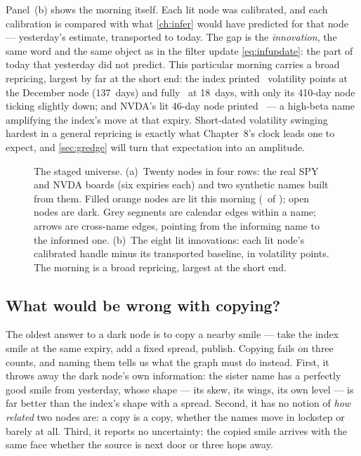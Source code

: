 Panel~(b) shows the morning itself.  Each lit node was calibrated, and
each calibration is compared with what \cref{ch:infer} would have
predicted for that node --- yesterday's estimate, transported to today.
The gap is the \emph{innovation}, the same word and the same object as
in the filter update \cref{eq:infupdate}: the part of today that
yesterday did not predict.  This particular morning carries a broad
repricing, largest by far at the short end: the index printed
\MacGrSpyDecObs\ volatility points at the December node (137~days)
and fully \MacGrSpyShortObs\ at 18~days, with only its 410-day node
ticking slightly down; and NVDA's lit 46-day node printed
\MacGrNvdaSepObs\ --- a high-beta name amplifying the index's move at
that expiry.  Short-dated volatility swinging hardest in a general
repricing is exactly what Chapter~8's clock leads one to expect, and
\cref{sec:gredge} will turn that expectation into an amplitude.

\begin{figure}[htbp]
\centering
{}
\caption{The staged universe.  (a)~Twenty nodes in four rows: the real
SPY and NVDA boards (six expiries each) and two synthetic names built
from them.  Filled orange nodes are lit this morning
(\MacGrLitCount\ of \MacGrNodeCount); open nodes are dark.  Grey
segments are calendar edges within a name; arrows are cross-name
edges, pointing from the informing name to the informed one.
(b)~The eight lit innovations: each lit node's calibrated handle minus
its transported baseline, in volatility points.  The morning is a
broad repricing, largest at the short end.}
\label{fig:gruniverse}
\end{figure}

\subsection{What would be wrong with copying?}

The oldest answer to a dark node is to copy a nearby smile --- take the
index smile at the same expiry, add a fixed spread, publish.  Copying
fails on three counts, and naming them tells us what the graph
must do instead.  First, it throws away the dark node's own
information: the sister name has a perfectly good smile from
yesterday, whose shape --- its skew, its wings, its own level --- is far
better than the index's shape with a spread.  Second, it has no notion
of \emph{how related} two nodes are: a copy is a copy, whether the
names move in lockstep or barely at all.  Third, it reports no
uncertainty: the copied smile arrives with the same face whether the
source is next door or three hops away.

